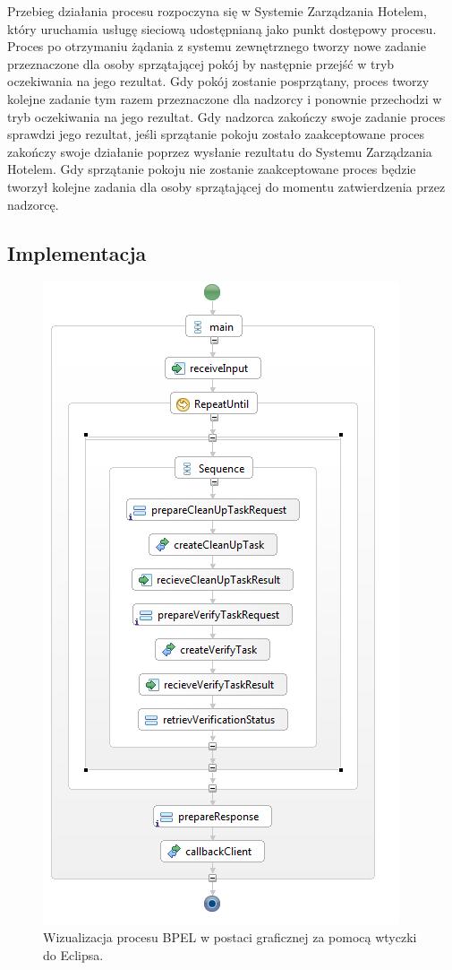 Przebieg działania procesu rozpoczyna się w Systemie Zarządzania Hotelem, który uruchamia usługę sieciową udostępnianą jako punkt dostępowy procesu. Proces po otrzymaniu żądania z systemu zewnętrznego tworzy nowe zadanie przeznaczone dla osoby sprzątającej pokój by następnie przejść w tryb oczekiwania na jego rezultat. Gdy pokój zostanie posprzątany, proces tworzy kolejne zadanie tym razem przeznaczone dla nadzorcy i ponownie przechodzi w tryb oczekiwania na jego rezultat. Gdy nadzorca zakończy swoje zadanie proces sprawdzi jego rezultat, jeśli sprzątanie pokoju zostało zaakceptowane proces zakończy swoje działanie poprzez wysłanie rezultatu do Systemu Zarządzania Hotelem. Gdy sprzątanie pokoju nie zostanie zaakceptowane proces będzie tworzył  kolejne zadania dla osoby sprzątającej do momentu zatwierdzenia przez nadzorcę. 


\subsection{Implementacja}

\begin{figure}[h]
\centerline{\includegraphics[scale=0.6]{bpelProcess}}
\caption{Wizualizacja procesu BPEL w postaci graficznej za pomocą wtyczki do Eclipsa.}
\label{fig:bpelProcess}
\end{figure}

